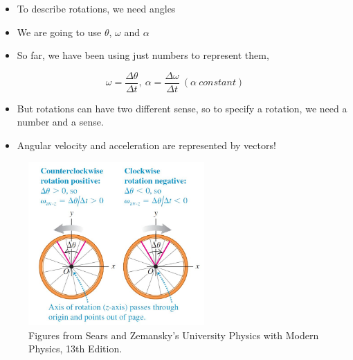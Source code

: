 \documentclass[]{beamer}
\begin{document}
    
     \begin{frame}
   
    

      \begin{itemize}
          \item  To describe rotations, we need angles
          \pause
          \item We are going to use $\theta$, $\omega$ and $\alpha$
          \pause
          \item So far, we have been using just numbers to represent them,

      \end{itemize}
    
      \begin{equation*}
        \omega = \frac{\Delta \theta}{\Delta t},\ \alpha=\frac{\Delta \omega}{\Delta t} \ (\alpha \ constant)
      \end{equation*}

       \pause


       \begin{itemize}
        \item  But rotations can have two different sense, so to specify a rotation, 
        we need a number and a sense.
         \item Angular velocity and acceleration are represented by vectors!

    \end{itemize}

         \end{frame}
    

         \begin{frame}
     
        
    

    
         \begin{figure}[h!]  
            \includegraphics[width=0.6\textwidth]{images/12.jpg}
            \caption{ {\tiny Figures from Sears and Zemansky's University Physics 
            with Modern Physics, 13th Edition.} }
          \end{figure}
    
    
        
        
             \end{frame}
        
\end{document}

